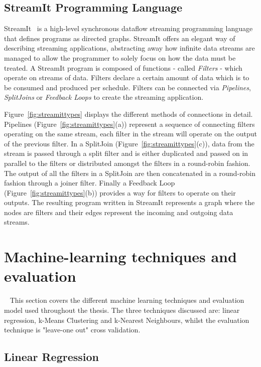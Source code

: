 \subsection{StreamIt Programming Language}
StreamIt~\cite{theis2002streamit} is a high-level synchronous dataflow streaming programming language that defines programs as directed graphs.
StreamIt offers an elegant way of describing streaming applications, abstracting away how infinite data streams are managed to allow the programmer to solely focus on how the data must be treated.
A StreamIt program is composed of functions - called \textit{Filters} - which operate on streams of data.
Filters declare a certain amount of data which is to be consumed and produced per schedule.
Filters can be connected via \textit{Pipelines}, \textit{SplitJoins} or \textit{Feedback Loops} to create the streaming application.

Figure~\ref{fig:streamittypes} displays the different methods of connections in detail.
Pipelines (Figure~\ref{fig:streamittypes}(a)) represent a sequence of connecting filters operating on the same stream, each filter in the stream will operate on the output of the previous filter.
In a SplitJoin (Figure~\ref{fig:streamittypes}(c)), data from the stream is passed through a split filter and is either duplicated and passed on in parallel to the filters or distributed amongst the filters in a round-robin fashion.
The output of all the filters in a SplitJoin are then concatenated in a round-robin fashion through a joiner filter.
Finally a Feedback Loop (Figure~\ref{fig:streamittypes}(b)) provides a way for filters to operate on their outputs.
The resulting program written in StreamIt represents a graph where the nodes are filters and their edges represent the incoming and outgoing data streams.

\section{Machine-learning techniques and evaluation}~\label{sec:ml}
This section covers the different machine learning techniques and evaluation model used throughout the thesis.
The three techniques discussed are: linear regression, k-Means Clustering and k-Nearest Neighbours, whilst the evaluation technique is "leave-one out" cross validation.

\subsection{Linear Regression}~\label{sec:lr}

